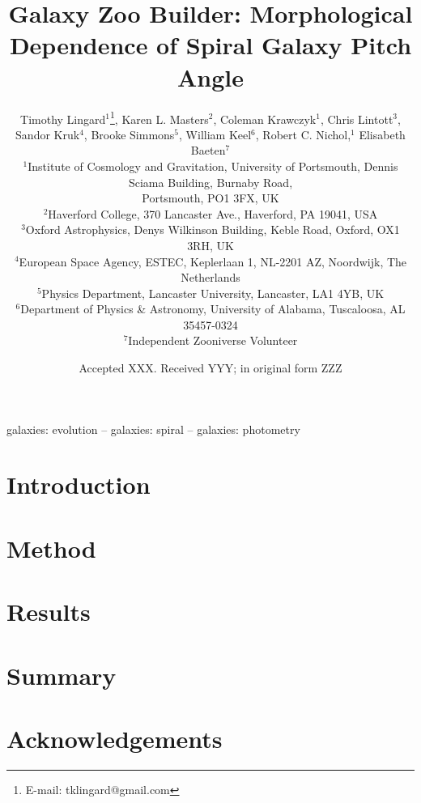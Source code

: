 \documentclass[fleqn,usenatbib]{mnras}
\title[Galaxy Zoo Builder: Morphological Dependence of Spiral galaxy Pitch Angle]{Galaxy Zoo Builder: Morphological Dependence of Spiral Galaxy Pitch Angle}
\author[T. Lingard et al.]{
  Timothy Lingard$^{1}$\thanks{E-mail: tklingard@gmail.com}, %
  Karen L. Masters$^{2}$, %
  Coleman Krawczyk$^{1}$, %
  Chris Lintott$^{3}$, %
  \newauthor
  Sandor Kruk$^{4}$, %
  Brooke Simmons$^{5}$, %
  William Keel$^{6}$, %
  Robert C. Nichol,$^{1}$ %
  \newauthor
  Elisabeth Baeten$^{7}$
  \\
  $^{1}$Institute of Cosmology and Gravitation, University of Portsmouth, Dennis Sciama Building, Burnaby Road,\\
  Portsmouth, PO1 3FX, UK\\
  $^{2}$Haverford College, 370 Lancaster Ave., Haverford, PA 19041, USA\\
  $^{3}$Oxford Astrophysics, Denys Wilkinson Building, Keble Road, Oxford, OX1 3RH, UK\\
  $^{4}$European Space Agency, ESTEC, Keplerlaan 1, NL-2201 AZ, Noordwijk, The Netherlands\\
  $^{5}$Physics Department, Lancaster University, Lancaster, LA1 4YB, UK\\
  $^{6}$Department of Physics \& Astronomy, University of Alabama, Tuscaloosa, AL 35457-0324\\
  $^{7}$Independent Zooniverse Volunteer\\
}
\date{Accepted XXX. Received YYY; in original form ZZZ}
\begin{document}
\label{firstpage}
\pagerange{\pageref{firstpage}--\pageref{lastpage}}
\maketitle

\begin{abstract}

\end{abstract}

\begin{keywords}
galaxies: evolution -- galaxies: spiral -- galaxies: photometry
\end{keywords}



% 

\section{Introduction}


\section{Method}


\section{Results}


\section{Summary}


\section{Acknowledgements}


\end{document}
